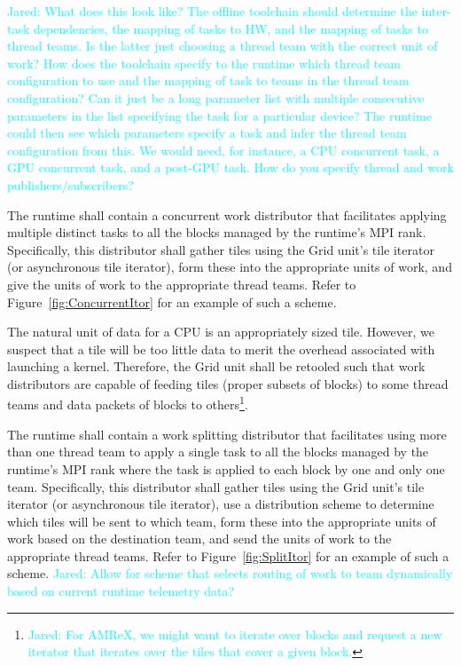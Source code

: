 \documentclass{article}
\newcommand{\Jared}[1]          {\textcolor{cyan}{Jared: #1}}
\begin{document}
\Jared{What does this look like?  The offline toolchain should
determine the inter-task dependencies, the mapping of tasks to HW, and the
mapping of tasks to thread teams.  Is the latter just choosing a thread team
with the correct unit of work?  How does the toolchain specify to the runtime
which thread team configuration to use and the mapping of task to teams in the
thread team configuration?  Can it just be a long parameter list with multiple
consecutive parameters in the list specifying the task for a particular device?
The runtime could then see which parameters specify a task and infer the thread
team configuration from this.  We would need, for instance, a CPU concurrent
task, a GPU concurrent task, and a post-GPU task.  How do you specify thread and
work publishers/subscribers?}

\begin{req}
The runtime shall contain a concurrent work distributor that facilitates
applying multiple distinct tasks to all the blocks managed by the runtime's MPI
rank.  Specifically, this distributor shall gather tiles using the Grid unit's
tile iterator (or asynchronous tile iterator), form these into the appropriate
units of work, and give the units of work to the appropriate thread teams.
Refer to Figure~\ref{fig:ConcurrentItor} for an example of such a scheme.
\end{req}

\begin{req}
The natural unit of data for a CPU is an appropriately sized tile.  However, we
suspect that a tile will be too little data to merit the overhead associated
with launching a kernel.  Therefore, the Grid unit shall be retooled such that
work distributors are capable of feeding tiles (proper subsets of blocks) to
some thread teams and data packets of blocks to
others\footnote{\Jared{For AMReX, we might want to iterate over blocks
and request a new iterator that iterates over the tiles that cover a given
block.}}.
\end{req}

\begin{req}
The runtime shall contain a work splitting distributor that facilitates
using more than one thread team to apply a single task to all the
blocks managed by the runtime's MPI rank where the task is applied to
each block by one and only one team.  Specifically, this distributor shall
gather tiles using the Grid unit's tile iterator (or asynchronous tile
iterator), use a distribution scheme to determine which tiles will be sent to
which team, form these into the appropriate units of work based on the
destination team, and send the units of work to the appropriate thread teams.
Refer to Figure~\ref{fig:SplitItor} for an example of such a scheme.
\Jared{Allow for scheme that selects routing of work to team
dynamically based on current runtime telemetry data?}
\end{req}
\end{document}
